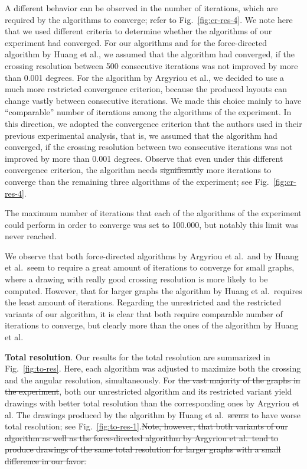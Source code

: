 \documentclass{comjnl}
\newcommand{\myparagraph}[1]{\medskip\noindent\textbf{#1}.}
\providecommand{\DIFaddtex}[1]{{\protect\color{blue}\uwave{#1}}} %
\providecommand{\DIFdeltex}[1]{{\protect\color{red}\sout{#1}}}                      %
\providecommand{\DIFaddbegin}{} %
\providecommand{\DIFaddend}{} %
\providecommand{\DIFdelbegin}{} %
\providecommand{\DIFdelend}{} %
\providecommand{\DIFadd}[1]{\texorpdfstring{\DIFaddtex{#1}}{#1}} %
\providecommand{\DIFdel}[1]{\texorpdfstring{\DIFdeltex{#1}}{}} %
\newcommand{\DIFscaledelfig}{0.5}
\newlength{\DIFdelgraphicswidth} %
\newlength{\DIFdelgraphicsheight} %
\newcommand{\DIFaddincludegraphics}[2][]{{\color{blue}\fbox{\DIFOincludegraphics[#1]{#2}}}} %
\newcommand{\DIFdelincludegraphics}[2][]{%
\sbox{\DIFdelgraphicsbox}{\DIFOincludegraphics[#1]{#2}}%
\settoboxwidth{\DIFdelgraphicswidth}{\DIFdelgraphicsbox} %
\settoboxtotalheight{\DIFdelgraphicsheight}{\DIFdelgraphicsbox} %
\scalebox{\DIFscaledelfig}{%
\parbox[b]{\DIFdelgraphicswidth}{\usebox{\DIFdelgraphicsbox}\\[-\baselineskip] \rule{\DIFdelgraphicswidth}{0em}}\llap{\resizebox{\DIFdelgraphicswidth}{\DIFdelgraphicsheight}{%
\setlength{\unitlength}{\DIFdelgraphicswidth}%
\begin{picture}(1,1)%
\thicklines\linethickness{2pt} %
{\color[rgb]{1,0,0}\put(0,0){\framebox(1,1){}}}%
{\color[rgb]{1,0,0}\put(0,0){\line( 1,1){1}}}%
{\color[rgb]{1,0,0}\put(0,1){\line(1,-1){1}}}%
\end{picture}%
}\hspace*{3pt}}} %
} %
\DeclareRobustCommand{\DIFaddbegin}{\DIFOaddbegin \let\includegraphics\DIFaddincludegraphics} %
\DeclareRobustCommand{\DIFaddend}{\DIFOaddend \let\includegraphics\DIFOincludegraphics} %
\DeclareRobustCommand{\DIFdelbegin}{\DIFOdelbegin \let\includegraphics\DIFdelincludegraphics} %
\DeclareRobustCommand{\DIFdelend}{\DIFOaddend \let\includegraphics\DIFOincludegraphics} %
\begin{document}
A different behavior can be observed in the number of iterations, which are required by the algorithms to converge; refer to Fig.~\ref{fig:cr-res-4}. We note here that we used different criteria to determine whether the algorithms of our experiment had converged. For our algorithms and for the force-directed algorithm by Huang et al., we assumed that the algorithm had converged, if the crossing resolution between 500 consecutive iterations was not improved by more than 0.001 degrees. For the algorithm by Argyriou et al., we decided to use a much more restricted convergence criterion, because the produced layouts can change vastly between  consecutive iterations. We made this choice mainly to have ``comparable'' number of iterations among the algorithms of the experiment. In this direction, we adopted the convergence criterion that the authors used in their previous experimental analysis, that is, we assumed that the algorithm had converged, if the crossing resolution between two consecutive iterations was not improved by more than 0.001 degrees. Observe that even under this different convergence criterion, the algorithm needs \DIFdelbegin \DIFdel{significantly }\DIFdelend more iterations to converge than the remaining three algorithms of the experiment; see Fig.~\ref{fig:cr-res-4}. 

The maximum number of iterations that each of the algorithms of the experiment could perform in order to converge was set to 100.000, but notably this limit was never reached. 

We observe that both force-directed algorithms by Argyriou et al.\ and by Huang et al.\ seem to require a great amount of iterations to converge for small graphs, where a drawing with really good crossing resolution is more likely to be computed. However, that for larger graphs the algorithm by Huang et al.\ requires the least amount of iterations. Regarding the unrestricted and the restricted variants of our algorithm, it is clear that both require comparable number of iterations to converge, but clearly more than the ones of the algorithm by Huang et al.

\myparagraph{Total resolution} Our results for the total resolution are summarized in Fig.~\ref{fig:to-res}. Here, each algorithm was adjusted to maximize both the crossing and the angular resolution, simultaneously. For \DIFdelbegin \DIFdel{the vast majority of the graphs in the experiment}\DIFdelend \DIFaddbegin \DIFadd{graphs with more 20 vertices}\DIFaddend , both our unrestricted algorithm and its restricted variant yield drawings with better total resolution than the corresponding ones by Argyriou et al. The drawings produced by the algorithm by Huang et al.\ \DIFdelbegin \DIFdel{seems }\DIFdelend \DIFaddbegin \DIFadd{seem }\DIFaddend to have worse total resolution; see Fig.~\ref{fig:to-res-1}.\DIFdelbegin \DIFdel{Note, however, that both variants of our algorithm as well as the force-directed algorithm by Argyriou et al.\ tend to produce drawings of the same total resolution for larger graphs with a small difference in our favor.
}\DIFdelend %
\end{document}
